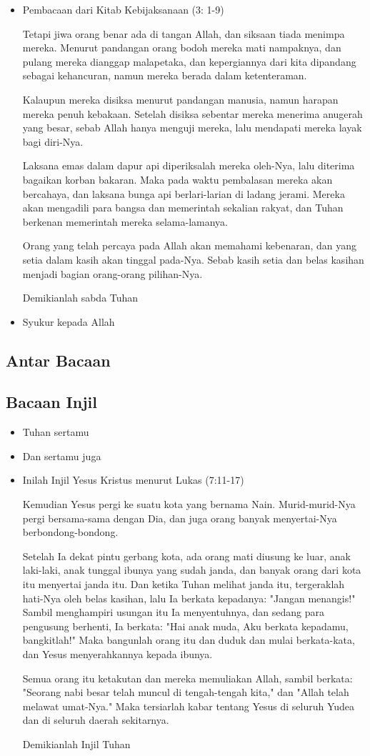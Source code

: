 \documentclass[a5paper,headsepline,titlepage,11pt,nnormalheadings,DIVcalc]{scrbook}
\newcommand{\BU}[1]{\begin{itemize} \item[U:] #1 \end{itemize}}
\newcommand{\BP}[1]{\begin{itemize} \item[P:] #1 \end{itemize}}
\begin{document}
\BP{Pembacaan dari Kitab Kebijaksanaan (3: 1-9) 

Tetapi jiwa orang benar ada di tangan Allah, dan siksaan tiada menimpa mereka.
Menurut pandangan orang bodoh mereka mati nampaknya, dan pulang mereka dianggap malapetaka,
dan kepergiannya dari kita dipandang sebagai kehancuran, namun mereka berada dalam ketenteraman.

Kalaupun mereka disiksa menurut pandangan manusia, namun harapan mereka penuh kebakaan.
Setelah disiksa sebentar mereka menerima anugerah yang besar, sebab Allah hanya menguji mereka, lalu mendapati mereka layak bagi diri-Nya.

Laksana emas dalam dapur api diperiksalah mereka oleh-Nya, lalu diterima bagaikan korban bakaran.
Maka pada waktu pembalasan mereka akan bercahaya, dan laksana bunga api berlari-larian di ladang jerami.
Mereka akan mengadili para bangsa dan memerintah sekalian rakyat, dan Tuhan berkenan memerintah mereka selama-lamanya.

Orang yang telah percaya pada Allah akan memahami kebenaran, dan yang setia dalam kasih akan tinggal pada-Nya. Sebab kasih setia dan belas kasihan menjadi bagian orang-orang pilihan-Nya.

Demikianlah sabda Tuhan }

\BU{Syukur kepada Allah} 

\subsection*{Antar Bacaan} 

\subsection*{Bacaan Injil} 

\BP{Tuhan sertamu} 
\BU{Dan sertamu juga} 
\BP{Inilah Injil Yesus Kristus menurut Lukas (7:11-17) 

Kemudian Yesus pergi ke suatu kota yang bernama Nain. Murid-murid-Nya pergi bersama-sama dengan Dia, dan juga orang banyak menyertai-Nya berbondong-bondong.

Setelah Ia dekat pintu gerbang kota, ada orang mati diusung ke luar, anak laki-laki, anak tunggal ibunya yang sudah janda, dan banyak orang dari kota itu menyertai janda itu.
Dan ketika Tuhan melihat janda itu, tergeraklah hati-Nya oleh belas kasihan, lalu Ia berkata kepadanya: "Jangan menangis!"
Sambil menghampiri usungan itu Ia menyentuhnya, dan sedang para pengusung berhenti, Ia berkata: "Hai anak muda, Aku berkata kepadamu, bangkitlah!"
Maka bangunlah orang itu dan duduk dan mulai berkata-kata, dan Yesus menyerahkannya kepada ibunya.

Semua orang itu ketakutan dan mereka memuliakan Allah, sambil berkata: "Seorang nabi besar telah muncul di tengah-tengah kita," dan "Allah telah melawat umat-Nya."
Maka tersiarlah kabar tentang Yesus di seluruh Yudea dan di seluruh daerah sekitarnya.

Demikianlah Injil Tuhan} 
\end{document}
